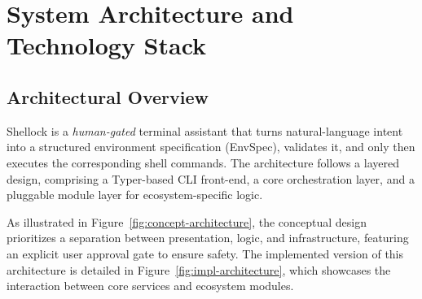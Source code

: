 \documentclass[12pt,a4paper]{article}
\begin{document}






\section{System Architecture and Technology Stack}

\subsection{Architectural Overview}

Shellock is a \emph{human-gated} terminal assistant that turns natural-language intent into a
structured environment specification (EnvSpec), validates it, and only then executes the
corresponding shell commands. The architecture follows a layered design, comprising a Typer-based CLI
front-end, a core orchestration layer, and a pluggable module layer for ecosystem-specific logic.\cite{parnas1972} 
 
As illustrated in Figure~\ref{fig:concept-architecture}, the conceptual design prioritizes a 
separation between presentation, logic, and infrastructure, featuring an explicit user approval 
gate to ensure safety. The implemented version of this architecture is detailed in 
Figure~\ref{fig:impl-architecture}, which showcases the interaction between core services 
and ecosystem modules.
\end{document}
